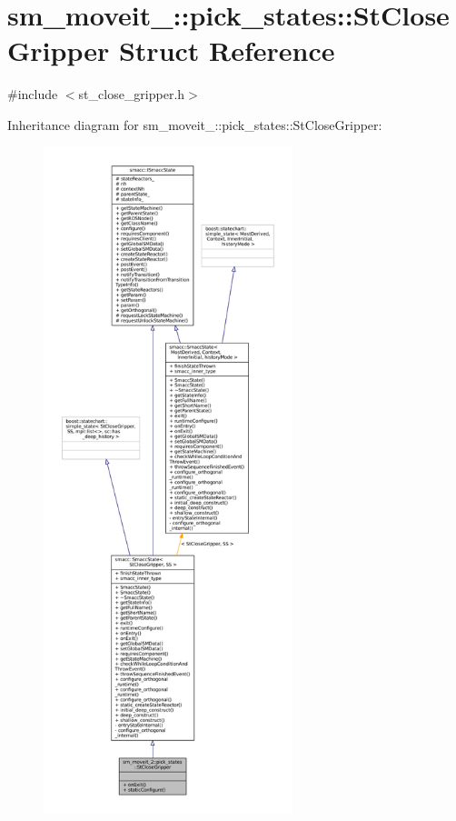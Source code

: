 \hypertarget{structsm__moveit__2_1_1pick__states_1_1StCloseGripper}{}\section{sm\+\_\+moveit\+\_\+:\+:pick\+\_\+states\+:\+:St\+Close\+Gripper Struct Reference}
\label{structsm__moveit__2_1_1pick__states_1_1StCloseGripper}


{\ttfamily \#include $<$st\+\_\+close\+\_\+gripper.\+h$>$}



Inheritance diagram for sm\+\_\+moveit\+\_\+:\+:pick\+\_\+states\+:\+:St\+Close\+Gripper\+:
\nopagebreak
\begin{figure}[H]
\begin{center}
\leavevmode
\includegraphics[height=550pt]{structsm__moveit__2_1_1pick__states_1_1StCloseGripper__inherit__graph}
\end{center}
\end{figure}


